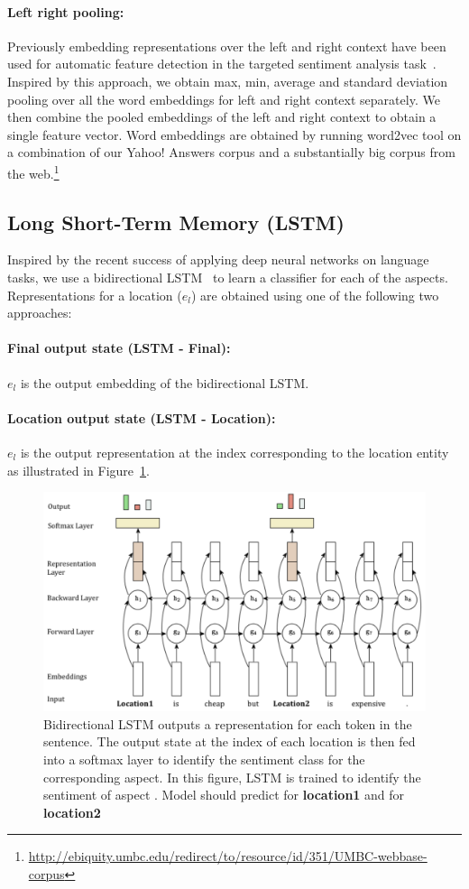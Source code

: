 \documentclass[11pt]{article}
\begin{document}
        \paragraph{Left right pooling:} Previously embedding representations over the left and right context have been used for automatic feature detection in the targeted sentiment analysis task~\cite{vo2015target}.
        Inspired by this approach, we obtain max, min, average and standard deviation pooling over all the word embeddings for left and right context separately. We then combine the pooled embeddings of the left and right context to obtain a single feature vector. Word embeddings are obtained by running word2vec tool on a combination of our Yahoo! Answers corpus and a substantially big corpus from the web.\footnote{\url{http://ebiquity.umbc.edu/redirect/to/resource/id/351/UMBC-webbase-corpus}}
    \subsection{Long Short-Term Memory (LSTM)}
        Inspired by the recent success of applying deep neural networks on language tasks, we use a bidirectional LSTM~\cite{hochreiter1997long} to learn a classifier for each of the aspects. Representations for a location ($e_l$) are obtained using one of the following two approaches:
        \paragraph{Final output state (LSTM - Final): } $e_l$ is the output embedding of the bidirectional LSTM.
        \paragraph{Location output state (LSTM - Location):} $e_l$ is the output representation at the index corresponding to the location entity as illustrated in Figure~\ref{fig:model_bi_lstm}.
        \begin{figure}[ht]
          \centering
              \includegraphics[width=.85\linewidth]{figures/model.pdf}
          \caption{Bidirectional LSTM outputs a representation for each token in the sentence. The output state at the index of each location is then fed into a softmax layer to identify the sentiment class for the corresponding aspect. In this figure, LSTM is trained to identify the sentiment of aspect . Model should predict  for \textbf{location1} and  for \textbf{location2}}
          \label{fig:model_bi_lstm}
        \end{figure}
        
\end{document}
